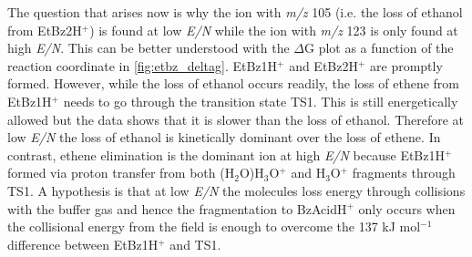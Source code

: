The question that arises now is why the ion with \textit{m/z} 105 (i.e. the loss of ethanol from EtBz2H$^+$) is found at low \textit{E/N} while the ion with \textit{m/z} 123 is only found at high \textit{E/N}.
%
This can be better understood with the $\Delta$G plot as a function of the reaction coordinate in \autoref{fig:etbz_deltag}.
%
%
%
%
%
%
%
EtBz1H$^+$ and EtBz2H$^+$ are promptly formed.
%
However, while the loss of ethanol occurs readily, the loss of ethene from EtBz1H$^+$ needs to go through the transition state TS1.
%
This is still energetically allowed but the data shows that it is slower than the loss of ethanol.
%
Therefore at low \textit{E/N}  the loss of ethanol is kinetically dominant over the loss of ethene.
%
In contrast, ethene elimination is the dominant ion at high \textit{E/N} because EtBz1H$^+$ formed via proton transfer from both (H$_2$O)H$_3$O$^+$ and H$_3$O$^+$ 
fragments through TS1.
%
A hypothesis is that at low \textit{E/N} the molecules loss energy through collisions with the buffer gas and hence the fragmentation to BzAcidH$^+$ only occurs when the collisional energy from the field is enough to overcome the 137 kJ mol$^{-1}$ difference between EtBz1H$^+$ and TS1.










